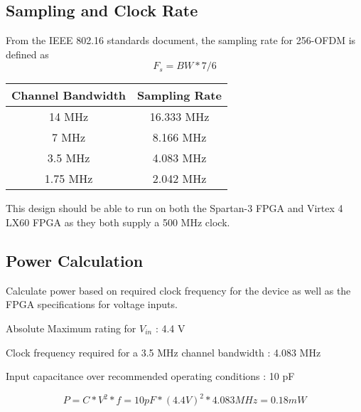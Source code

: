 \documentclass[dvips,10pt,twocolumn]{article}
\begin{document}
  \subsection{Sampling and Clock Rate}
    From the IEEE 802.16 standards document, the sampling rate for 256-OFDM is defined as
    \begin{equation}
    F_s = BW * 7/6
    \end{equation}
  
  \begin{center}
  \begin{tabular}{c|c}
  Channel Bandwidth & Sampling Rate \\ \hline
  14 MHz & 16.333 MHz \\
  7 MHz & 8.166 MHz \\
  3.5 MHz & 4.083 MHz \\
  1.75 MHz & 2.042 MHz
  \end{tabular}
  \end{center}
  
  This design should be able to run on both the Spartan-3 FPGA and Virtex 4 LX60
  FPGA as they both supply a 500 MHz clock.
  
  \subsection{Power Calculation}
  
  Calculate power based on required clock frequency for the device as well as the
  FPGA specifications for voltage inputs.
  
  Absolute Maximum rating for $V_{in}$ : 4.4 V
  
  Clock frequency required for a 3.5 MHz channel bandwidth : 4.083 MHz
  
  Input capacitance over recommended operating conditions : 10 pF
  \begin{center}
  \begin{equation}
  P = C * V^2 * f = 10 pF * (4.4 V)^2 * 4.083 MHz = 0.18 mW
  \end{equation}
  \end{center}
  
\end{document}
